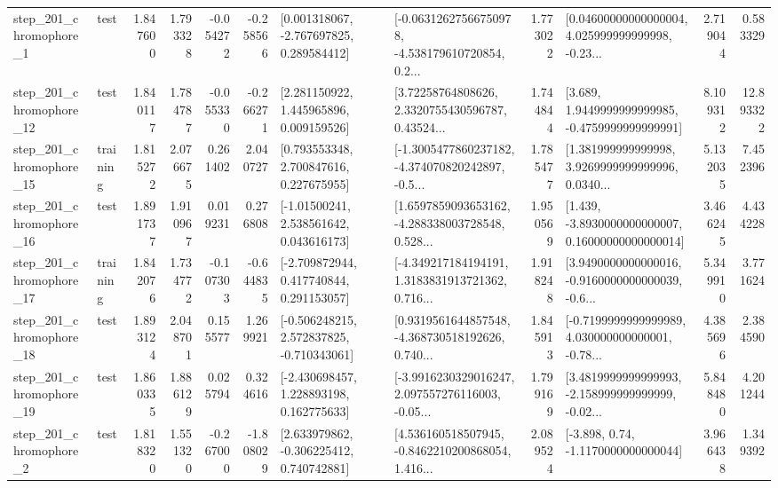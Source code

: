\begin{tabular}{llrrrrllrlrr}
   step\_201\_chromophore\_1 &      test &      1.847600 &    1.793328 &     -0.054272 & -0.258566 &    [0.001318067, -2.767697825, 0.289584412] &  [-0.06312627566750978, -4.538179610720854, 0.2... &       1.773022 &  [0.04600000000000004, 4.025999999999998, -0.23... &            2.719044 &          0.583329 \\
  step\_201\_chromophore\_12 &      test &      1.840117 &    1.784787 &     -0.055330 & -0.266271 &     [2.281150922, 1.445965896, 0.009159526] &  [3.72258764808626, 2.3320755430596787, 0.43524... &       1.744844 &   [3.689, 1.9449999999999985, -0.4759999999999991] &            8.109312 &         12.893322 \\
  step\_201\_chromophore\_15 &  training &      1.815272 &    2.076675 &      0.261402 &  2.040727 &     [0.793553348, 2.700847616, 0.227675955] &  [-1.3005477860237182, -4.374070820242897, -0.5... &       1.785477 &  [1.381999999999998, 3.9269999999999996, 0.0340... &            5.132035 &          7.452396 \\
  step\_201\_chromophore\_16 &      test &      1.891737 &    1.910967 &      0.019231 &  0.276808 &     [-1.01500241, 2.538561642, 0.043616173] &  [1.6597859093653162, -4.288338003728548, 0.528... &       1.950569 &  [1.439, -3.8930000000000007, 0.16000000000000014] &            3.466245 &          4.434228 \\
  step\_201\_chromophore\_17 &  training &      1.842076 &    1.734772 &     -0.107303 & -0.644835 &    [-2.709872944, 0.417740844, 0.291153057] &  [-4.349217184194191, 1.3183831913721362, 0.716... &       1.918248 &  [3.9490000000000016, -0.9160000000000039, -0.6... &            5.349910 &          3.771624 \\
  step\_201\_chromophore\_18 &      test &      1.893124 &    2.048701 &      0.155577 &  1.269921 &   [-0.506248215, 2.572837825, -0.710343061] &  [0.9319561644857548, -4.368730518192626, 0.740... &       1.845913 &  [-0.7199999999999989, 4.030000000000001, -0.78... &            4.385696 &          2.384590 \\
  step\_201\_chromophore\_19 &      test &      1.860335 &    1.886129 &      0.025794 &  0.324616 &    [-2.430698457, 1.228893198, 0.162775633] &  [-3.9916230329016247, 2.097557276116003, -0.05... &       1.799169 &  [3.4819999999999993, -2.158999999999999, -0.02... &            5.848480 &          4.201244 \\
   step\_201\_chromophore\_2 &      test &      1.818320 &    1.551320 &     -0.267000 & -1.808029 &    [2.633979862, -0.306225412, 0.740742881] &  [4.536160518507945, -0.8462210200868054, 1.416... &       2.089524 &                [-3.898, 0.74, -1.1170000000000044] &            3.966438 &          1.349392 \\

\end{tabular}

